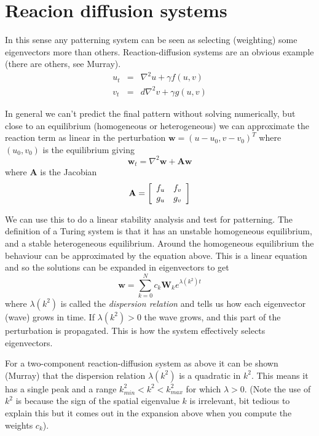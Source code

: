 \documentclass{report}
\renewcommand{\vec}[1]{\mathbf{#1}}
\newcommand{\mat}{\mathbf}
\begin{document}
\section{Reacion diffusion systems}
In this sense any patterning system can be seen as selecting (weighting)
some eigenvectors more than others. Reaction-diffusion systems are an obvious
example (there are others, see Murray). 
\begin{eqnarray}
u_t &=& \nabla^2u + \gamma f(u,v) \\
v_t &=& d \nabla^2v + \gamma g(u,v)
\end{eqnarray}

In general we can't predict the final pattern
without solving numerically, but close to an equilibrium (homogeneous or
heterogeneous) we can approximate the reaction term as linear in the
perturbation $\vec{w} = (u-u_0,v-v_0)^T$ where $(u_0,v_0)$ is the equilibrium
giving
\begin{equation}
\vec{w}_t = \nabla^2\vec{w} + \mat{A}\vec{w}
\end{equation}
where $\mat{A}$ is the Jacobian
\begin{equation}
\mat{A}=
 \left[
  \begin{array}{ c c }
     f_u & f_v \\
     g_u & g_v
  \end{array} \right]
\end{equation}

We can use this to do a linear stability analysis and test for patterning. The
definition of a Turing system is that it has an unstable homogeneous
equilibrium, and a stable heterogeneous equilibrium. Around the homogeneous
equilibrium the behaviour can be approximated by the equation above. This is a
linear equation and so the solutions can be expanded in eigenvectors to get
\begin{equation}
\vec{w} = \sum_{k=0}^{N} c_k \vec{W}_k e^{\lambda(k^2) t}
\end{equation}
where $\lambda(k^2)$ is called the \textit{dispersion relation} and tells us how
each eigenvector (wave) grows in time. If $\lambda(k^2)>0$ the wave grows, and
this part of the perturbation is propagated. This is how the system effectively
selects eigenvectors.

For a two-component reaction-diffusion system as above it can be shown (Murray)
that the dispersion relation $\lambda(k^2)$ is a quadratic in $k^2$. This means it
has a single peak and a range $k^2_{min}<k^2<k^2_{max}$ for which $\lambda>0$.
(Note the use of $k^2$ is because the sign of the spatial eigenvalue $k$ is
irrelevant, bit tedious to explain this but it comes out in the expansion above
when you compute the weights $c_k$).
\end{document}
